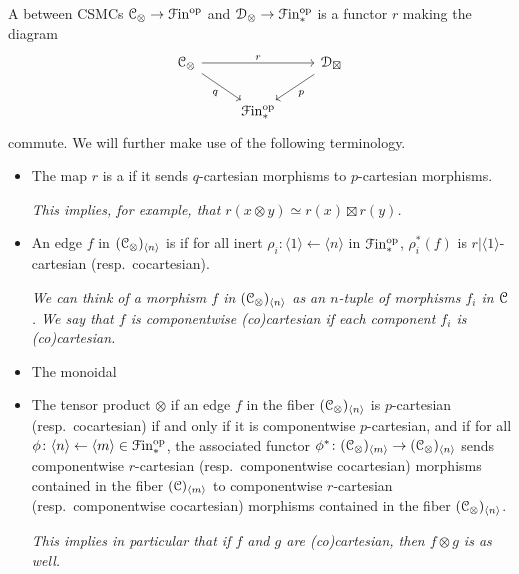 \documentclass[main.tex]{subfiles}
\begin{document}
\begin{definition}
  A  between CSMCs $\mathcal{C}_{\otimes} \to \mathcal{F}\mathrm{in}^{\mathrm{op}}$ and $\mathcal{D}_{\otimes} \to \mathcal{F}\mathrm{in}_{*}^{\mathrm{op}}$ is a functor $r$ making the diagram
  \begin{equation*}
    \begin{tikzcd}
      \category{C}_{\otimes}
      \arrow[rr, "r"]
      \arrow[dr, swap, "q"]
      && \category{D}_{\boxtimes}
      \arrow[dl, "p"]
      \\
      & \Finp\op
    \end{tikzcd}
  \end{equation*}
  commute. We will further make use of the following terminology.
  \begin{itemize}
    \item The map $r$ is a  if it sends $q$-cartesian morphisms to $p$-cartesian morphisms. 

      \textit{This implies, for example, that $r(x \otimes y) \simeq r(x) \boxtimes r(y)$.}

    \item An edge $f$ in $(\mathcal{C}_{\otimes})_{\langle n \rangle}$ is  if for all inert $\rho_{i}\colon \langle 1 \rangle \leftarrow \langle n \rangle$ in $\mathcal{F}\mathrm{in}_{*}^{\mathrm{op}}$, $\rho_{i}^{*}(f)$ is $r|\langle 1 \rangle$-cartesian (resp.\ cocartesian). 

      \textit{We can think of a morphism $f$ in $(\mathcal{C}_{\otimes})_{\langle n \rangle}$ as an $n$-tuple of morphisms $f_{i}$ in $\mathcal{C}$. We say that $f$ is componentwise (co)cartesian if each component $f_{i}$ is (co)cartesian.}

    \item The monoidal

    \item The tensor product $\otimes$  if an edge $f$ in the fiber $(\mathcal{C}_{\otimes})_{\langle n \rangle}$ is $p$-cartesian (resp.\ cocartesian) if and only if it is componentwise $p$-cartesian, and if for all $\phi\colon \langle n \rangle \leftarrow \langle m \rangle \in \mathcal{F}\mathrm{in}_{*}^{\mathrm{op}}$, the associated functor $\phi^{*}\colon (\mathcal{C}_{\otimes})_{\langle m \rangle} \to (\mathcal{C}_{\otimes})_{\langle n \rangle}$ sends componentwise $r$-cartesian (resp.\ componentwise cocartesian) morphisms contained in the fiber $(\mathcal{C})_{\langle m \rangle}$ to componentwise $r$-cartesian (resp.\ componentwise cocartesian) morphisms contained in the fiber $(\mathcal{C}_{\otimes})_{\langle n \rangle}$.

      \textit{This implies in particular that if $f$ and $g$ are (co)cartesian, then $f \otimes g$ is as well.}
  \end{itemize}
\end{definition}
\end{document}
